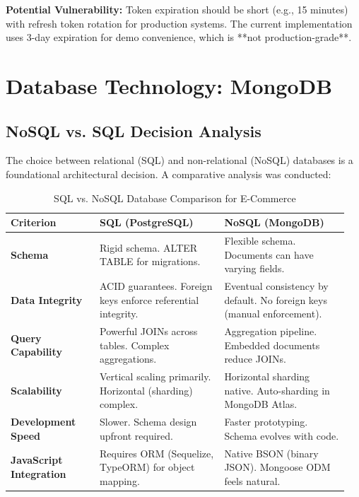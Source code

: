 \documentclass[12pt, a4paper]{report}
\begin{document}
\textbf{Potential Vulnerability:} Token expiration should be short (e.g., 15 minutes) with refresh token rotation for production systems. The current implementation uses 3-day expiration for demo convenience, which is **not production-grade**.

\section{Database Technology: MongoDB}

\subsection{NoSQL vs. SQL Decision Analysis}

The choice between relational (SQL) and non-relational (NoSQL) databases is a foundational architectural decision. A comparative analysis was conducted:

\begin{table}[H]
\centering
\caption{SQL vs. NoSQL Database Comparison for E-Commerce}
\label{tab:sql_vs_nosql}
\begin{tabular}{@{}p{0.25\linewidth}p{0.35\linewidth}p{0.35\linewidth}@{}}
\toprule
\textbf{Criterion} & \textbf{SQL (PostgreSQL)} & \textbf{NoSQL (MongoDB)} \\
\midrule
\textbf{Schema} & Rigid schema. ALTER TABLE for migrations. & Flexible schema. Documents can have varying fields. \\
\textbf{Data Integrity} & ACID guarantees. Foreign keys enforce referential integrity. & Eventual consistency by default. No foreign keys (manual enforcement). \\
\textbf{Query Capability} & Powerful JOINs across tables. Complex aggregations. & Aggregation pipeline. Embedded documents reduce JOINs. \\
\textbf{Scalability} & Vertical scaling primarily. Horizontal (sharding) complex. & Horizontal sharding native. Auto-sharding in MongoDB Atlas. \\
\textbf{Development Speed} & Slower. Schema design upfront required. & Faster prototyping. Schema evolves with code. \\
\textbf{JavaScript Integration} & Requires ORM (Sequelize, TypeORM) for object mapping. & Native BSON (binary JSON). Mongoose ODM feels natural. \\
\bottomrule
\end{tabular}
\end{table}
\end{document}
